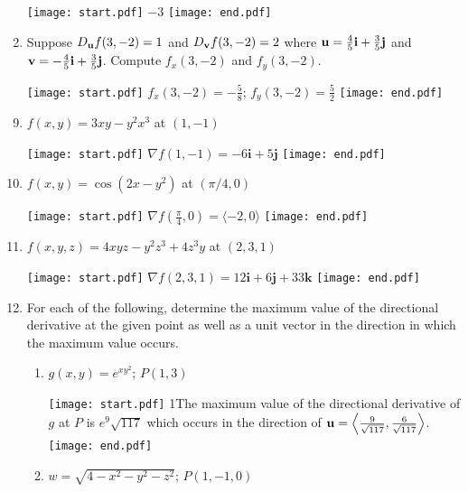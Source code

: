 \documentclass[12pt]{article}
\begin{document}
\begin{enumerate}
\texttt{[image: start.pdf]}
{{$-3$}}
\texttt{[image: end.pdf]}


\item Suppose $D_{\bf u}f(3,-2)=1$ and $D_{\bf v}f(3,-2)=2$ where ${\bf u}=\frac{4}{5}{\bf i}+\frac{3}{5}{\bf j}$ and ${\bf v}=-\frac{4}{5}{\bf i}+\frac{3}{5}{\bf j}$. Compute $f_x(3,-2)$ and $f_y(3,-2)$.

\texttt{[image: start.pdf]}
{{$f_x(3,-2)=-\frac{5}{8}$; $f_y(3,-2)=\frac{5}{2}$ }}
\texttt{[image: end.pdf]}


\end{enumerate}


\begin{enumerate}
\setcounter{enumi}{8}

\item $f(x,y)=3xy-y^2x^3$ at $(1, -1)$ 

\texttt{[image: start.pdf]}
{{$\nabla f(1,-1)=-6\mathbf{i}+5\mathbf{j}$}}
\texttt{[image: end.pdf]}


\item $f(x,y)=\cos{(2x-y^2)}$ at $(\pi/4, 0)$ 

\texttt{[image: start.pdf]}
{{$\nabla f\left(\frac{\pi}{4},0\right) = \langle-2,0\rangle$}}
\texttt{[image: end.pdf]}


\item $f(x,y,z)=4xyz-y^2z^3+4z^3y$ at $(2, 3, 1)$ 

\texttt{[image: start.pdf]}
{{$\nabla f(2,3,1)= 12\mathbf{i}+6\mathbf{j}+33\mathbf{k}$}}
\texttt{[image: end.pdf]}


\item For each of the following, determine the maximum value of the directional derivative at the given point as well as a unit vector in the direction in which the maximum value occurs.

\begin{enumerate}

\item $g(x,y)=e^{xy^2}$; $P(1, 3)$ 

\texttt{[image: start.pdf]}
{{{1\linewidth}{The maximum value of the directional derivative of $g$ at $P$ is $e^{9}\sqrt{117}$ which occurs in the direction of ${\bf u}=\left\langle \frac{9}{\sqrt{117}},\frac{6}{\sqrt{117}}\right\rangle$.}}}
\texttt{[image: end.pdf]}


\item $w=\sqrt{4-x^2-y^2-z^2}$; $P(1, -1, 0)$ 


\end{enumerate}
\end{enumerate}
\end{document}
